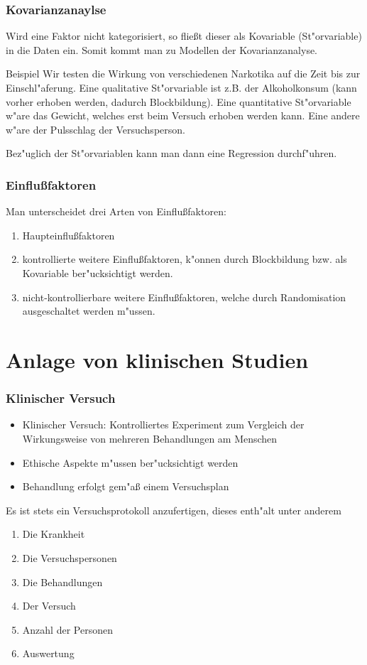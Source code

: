 \documentclass{beamer}
\begin{document}
\begin{frame}
  \frametitle{Kovarianzanaylse}
  \pause
  Wird eine Faktor nicht kategorisiert, so flie\ss t dieser als Kovariable (St"orvariable) in die Daten ein. Somit kommt man zu Modellen der Kovarianzanalyse.
  \pause
  \begin{exampleblock}{Beispiel}
    Wir testen die Wirkung von verschiedenen Narkotika auf die Zeit bis zur Einschl"aferung. Eine qualitative St"orvariable ist z.B. der Alkoholkonsum (kann vorher erhoben werden, dadurch Blockbildung). Eine quantitative St"orvariable w"are das Gewicht, welches erst beim Versuch erhoben werden kann. Eine andere w"are der Pulsschlag der Versuchsperson. 

  \end{exampleblock}
  \pause
  Bez"uglich der St"orvariablen kann man dann eine Regression durchf"uhren.
\end{frame}

\begin{frame}
  \frametitle{Einflu\ss faktoren}
  Man unterscheidet drei Arten von Einflu\ss faktoren:
  \begin{enumerate}[<+->]
    \item Haupteinflu\ss faktoren
    \item kontrollierte weitere Einflu\ss faktoren, k"onnen durch Blockbildung bzw. als Kovariable ber"ucksichtigt werden.
    \item nicht-kontrollierbare weitere Einflu\ss faktoren, welche durch Randomisation ausgeschaltet werden m"ussen. 
  \end{enumerate}
\end{frame}

\section{Anlage von klinischen Studien}

\begin{frame}
  \frametitle{Klinischer Versuch}
  \begin{itemize}[<+->]
    \item Klinischer Versuch: Kontrolliertes Experiment zum Vergleich der Wirkungsweise von mehreren Behandlungen am Menschen
    \item Ethische Aspekte m"ussen ber"ucksichtigt werden
    \item Behandlung erfolgt gem"a{\ss} einem Versuchsplan
  \end{itemize}
  \pause
  Es ist stets ein Versuchsprotokoll anzufertigen, dieses enth"alt unter anderem
  \begin{enumerate}[<+->]
    \item Die Krankheit
    \item Die Versuchspersonen
    \item Die Behandlungen
    \item Der Versuch
    \item Anzahl der Personen
    \item Auswertung
  \end{enumerate}

\end{frame}
\end{document}
